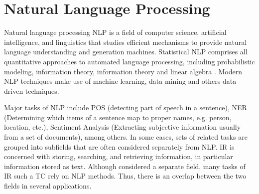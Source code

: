      

\section{Natural Language Processing}
\label{sec:rel_nlp}
Natural language processing \ac{NLP} is a field of computer science,
artificial intelligence, and linguistics that studies efficient mechanisms to
provide natural language understanding and generation  machines. 
Statistical \ac{NLP} comprises all quantitative approaches to automated
language processing, including probabilistic modeling, information theory,
information theory and linear algebra \cite{Manning:1999:FSN:311445}.  Modern
\ac{NLP}  techniques make  use of  machine learning, data mining  and others data
driven techniques.

Major tasks of \ac{NLP} include  \ac{POS} (detecting part of speech in a
sentence), \ac{NER}  (Determining which items of a sentence map to proper
names, e.g. person, location, etc.),   Sentiment Analysis (Extracting
subjective information usually from a set of documents), among others. 
In some cases, sets of related tasks are grouped into subfields that are often
considered separately from \ac{NLP}. \ac{IR} is concerned with storing,
searching, and retrieving information, in particular  information stored as
text. Although considered a separate field, many tasks of \ac{IR} such a
\ac{TC} rely on \ac{NLP} methods. Thus, there is an overlap between the two
fields in several applications.



